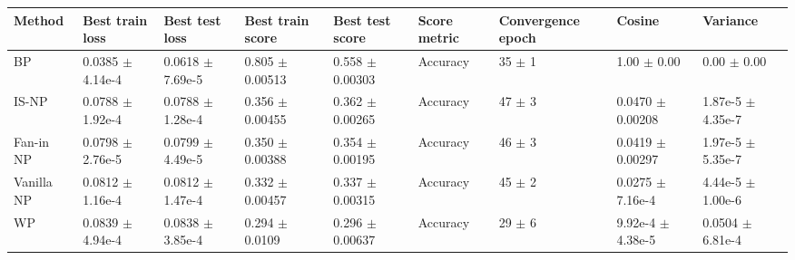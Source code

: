 \begin{tabular}{lllllllll}
\toprule
Method & Best train loss & Best test loss & Best train score & Best test score & Score metric & Convergence epoch & Cosine & Variance \\
\midrule
BP & 0.0385 $\pm$ 4.14e-4 & 0.0618 $\pm$ 7.69e-5 & 0.805 $\pm$ 0.00513 & 0.558 $\pm$ 0.00303 & Accuracy & 35 $\pm$ 1 & 1.00 $\pm$ 0.00 & 0.00 $\pm$ 0.00 \\
IS-NP & 0.0788 $\pm$ 1.92e-4 & 0.0788 $\pm$ 1.28e-4 & 0.356 $\pm$ 0.00455 & 0.362 $\pm$ 0.00265 & Accuracy & 47 $\pm$ 3 & 0.0470 $\pm$ 0.00208 & 1.87e-5 $\pm$ 4.35e-7 \\
Fan-in NP & 0.0798 $\pm$ 2.76e-5 & 0.0799 $\pm$ 4.49e-5 & 0.350 $\pm$ 0.00388 & 0.354 $\pm$ 0.00195 & Accuracy & 46 $\pm$ 3 & 0.0419 $\pm$ 0.00297 & 1.97e-5 $\pm$ 5.35e-7 \\
Vanilla NP & 0.0812 $\pm$ 1.16e-4 & 0.0812 $\pm$ 1.47e-4 & 0.332 $\pm$ 0.00457 & 0.337 $\pm$ 0.00315 & Accuracy & 45 $\pm$ 2 & 0.0275 $\pm$ 7.16e-4 & 4.44e-5 $\pm$ 1.00e-6 \\
WP & 0.0839 $\pm$ 4.94e-4 & 0.0838 $\pm$ 3.85e-4 & 0.294 $\pm$ 0.0109 & 0.296 $\pm$ 0.00637 & Accuracy & 29 $\pm$ 6 & 9.92e-4 $\pm$ 4.38e-5 & 0.0504 $\pm$ 6.81e-4 \\
\bottomrule
\end{tabular}
